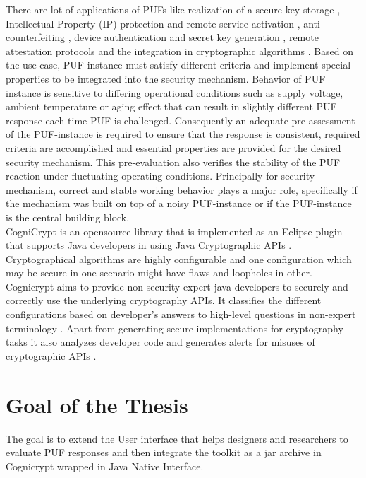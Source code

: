 There are lot of applications of PUFs like realization of a secure key storage \cite{2,3,4}, Intellectual Property (IP) protection and remote service activation \cite{5,11}, anti-counterfeiting \cite{6,7}, device authentication and secret key generation \cite{8,9,10}, remote attestation protocols \cite{12,13} and the integration in cryptographic algorithms \cite{14}. Based on the use case, PUF instance must satisfy different criteria and implement special properties to be integrated
into the security mechanism.
Behavior of PUF instance is sensitive to differing operational conditions such as supply voltage, ambient temperature or aging effect that can result in slightly different PUF response each time PUF is challenged. \pagebreak Consequently an adequate pre-assessment of the PUF-instance is required to ensure that the response is consistent, required criteria are accomplished and essential properties are provided for the desired security mechanism. This pre-evaluation also verifies the stability of
the PUF reaction under fluctuating operating conditions. Principally for security mechanism, correct and stable working behavior plays a major role, specifically if the mechanism was built on top of a noisy PUF-instance or if the PUF-instance is the central building block.\\

CogniCrypt is an opensource library that is implemented as an Eclipse plugin that supports Java developers in using Java Cryptographic APIs \cite{cogni}. Cryptographical algorithms are highly configurable and one configuration which may be secure in one scenario might have flaws and loopholes in other. Cognicrypt aims to provide non security expert java developers to securely and correctly use the underlying cryptography APIs. 
It classifies the different configurations based on developer's answers to high-level questions in non-expert terminology \cite{onward2015}. Apart from generating secure implementations for cryptography tasks it also analyzes developer code and generates alerts for misuses of cryptographic APIs \cite{cogni}. 


\section{Goal of the Thesis}
The goal is to extend the User interface that helps designers and researchers to evaluate PUF responses  and then integrate the toolkit as a jar archive in Cognicrypt wrapped in Java Native Interface.

